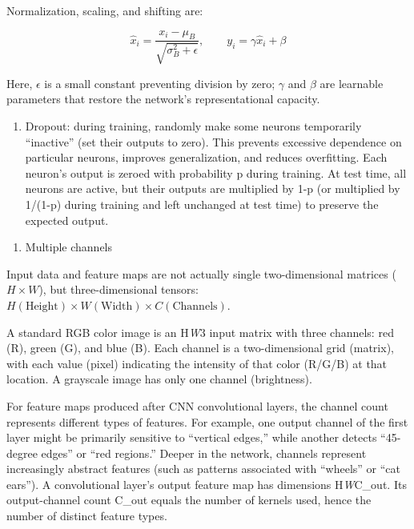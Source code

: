 Normalization, scaling, and shifting are:

\[
\hat{x}_i=\frac{x_i-\mu_B}{\sqrt{\sigma_B^2+\epsilon}},\qquad
y_i=\gamma\hat{x}_i+\beta
\]

Here, \(\epsilon\) is a small constant preventing division by zero; \(\gamma\) and \(\beta\) are learnable parameters that restore the network's representational capacity.

\begin{enumerate}
\def\labelenumi{(\arabic{enumi})}
\setcounter{enumi}{3}
\tightlist
\item
  Dropout: during training, randomly make some neurons temporarily ``inactive'' (set their outputs to zero). This prevents excessive dependence on particular neurons, improves generalization, and reduces overfitting. Each neuron's output is zeroed with probability p during training. At test time, all neurons are active, but their outputs are multiplied by 1-p (or multiplied by 1/(1-p) during training and left unchanged at test time) to preserve the expected output.
\end{enumerate}

\begin{enumerate}
\def\labelenumi{\arabic{enumi}.}
\setcounter{enumi}{5}
\tightlist
\item
  Multiple channels
\end{enumerate}

Input data and feature maps are not actually single two-dimensional matrices (\(H \times W\)), but three-dimensional tensors: \(H(\mathrm{Height}) \times W(\mathrm{Width}) \times C(\mathrm{Channels})\).

A standard RGB color image is an H\emph{W}3 input matrix with three channels: red (R), green (G), and blue (B). Each channel is a two-dimensional grid (matrix), with each value (pixel) indicating the intensity of that color (R/G/B) at that location. A grayscale image has only one channel (brightness).

For feature maps produced after CNN convolutional layers, the channel count represents different types of features. For example, one output channel of the first layer might be primarily sensitive to ``vertical edges,'' while another detects ``45-degree edges'' or ``red regions.'' Deeper in the network, channels represent increasingly abstract features (such as patterns associated with ``wheels'' or ``cat ears''). A convolutional layer's output feature map has dimensions H\emph{W}C\_out. Its output-channel count C\_out equals the number of kernels used, hence the number of distinct feature types.

